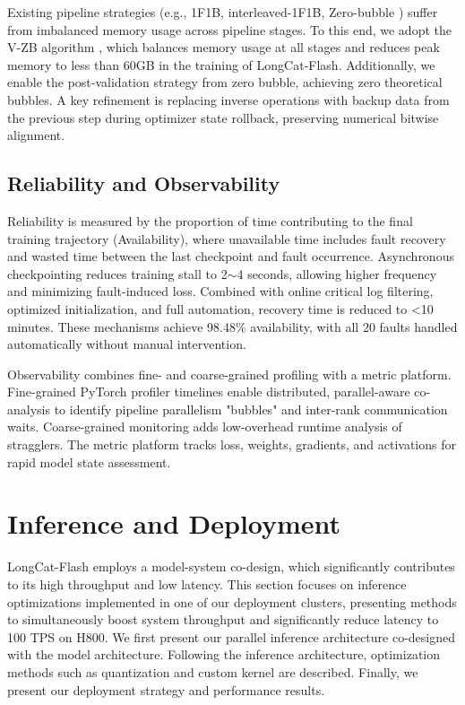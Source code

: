 \documentclass{article}
\newcommand{\longcat}{LongCat-Flash\xspace}
\begin{document}
Existing pipeline strategies (e.g., 1F1B, interleaved-1F1B, Zero-bubble \citep{qi2023zero}) suffer from imbalanced memory usage across pipeline stages. To this end, we adopt the V-ZB algorithm \citep{qi2024zbv}, which balances memory usage at all stages and reduces peak memory to less than 60GB in the training of \longcat. Additionally, we enable the post-validation strategy from zero bubble, achieving zero theoretical bubbles. A key refinement is replacing inverse operations with backup data from the previous step during optimizer state rollback, preserving numerical bitwise alignment.

\subsection{Reliability and Observability}
Reliability is measured by the proportion of time contributing to the final training trajectory (Availability), where unavailable time includes fault recovery and wasted time between the last checkpoint and fault occurrence. Asynchronous checkpointing reduces training stall to 2$\sim$4 seconds, allowing higher frequency and minimizing fault-induced loss. Combined with online critical log filtering, optimized initialization, and full automation, recovery time is reduced to <10 minutes. These mechanisms achieve 98.48\% availability, with all 20 faults handled automatically without manual intervention.

Observability combines fine- and coarse-grained profiling with a metric platform. Fine-grained PyTorch profiler timelines enable distributed, parallel-aware co-analysis to identify pipeline parallelism "bubbles" and inter-rank communication waits. Coarse-grained monitoring adds low-overhead runtime analysis of stragglers. The metric platform tracks loss, weights, gradients, and activations for rapid model state assessment.

\section{Inference and Deployment}

\longcat employs a model-system co-design, which significantly contributes to its high throughput and low latency. This section focuses on inference optimizations implemented in one of our deployment clusters, presenting methods to simultaneously boost system throughput and significantly reduce latency to 100 TPS on H800. We first present our parallel inference architecture co-designed with the model architecture. Following the inference architecture, optimization methods such as quantization and custom kernel are described. Finally, we present our deployment strategy and performance results.
\end{document}
